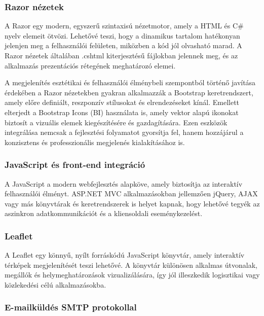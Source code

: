 \subsubsection{Razor nézetek}

\indent A Razor egy modern, egyszerű szintaxisú nézetmotor, amely a HTML és C\# nyelv elemeit ötvözi. Lehetővé teszi, hogy a dinamikus tartalom hatékonyan jelenjen meg a felhasználói felületen, miközben a kód jól olvasható marad. A Razor nézetek általában {.cshtml} kiterjesztésű fájlokban jelennek meg, és az alkalmazás prezentációs rétegének meghatározó elemei.

\indent A megjelenítés esztétikai és felhasználói élménybeli szempontból történő javítása érdekében a Razor nézetekben gyakran alkalmazzák a Bootstrap keretrendszert, amely előre definiált, reszponzív stílusokat és elrendezéseket kínál. Emellett elterjedt a Bootstrap Icons (BI) használata is, amely vektor alapú ikonokat biztosít a vizuális elemek kiegészítésére és gazdagítására. Ezen eszközök integrálása nemcsak a fejlesztési folyamatot gyorsítja fel, hanem hozzájárul a konzisztens és professzionális megjelenés kialakításához is.



\subsubsection{JavaScript és front-end integráció}

\indent A JavaScript a modern webfejlesztés alapköve, amely biztosítja az interaktív felhasználói élményt. ASP.NET MVC alkalmazásokban jellemzően jQuery, AJAX vagy más könyvtárak és keretrendszerek is helyet kapnak, hogy lehetővé tegyék az aszinkron adatkommunikációt és a kliensoldali eseménykezelést.

\subsubsection{Leaflet}

\indent A Leaflet egy könnyű, nyílt forráskódú JavaScript könyvtár, amely interaktív térképek megjelenítését teszi lehetővé. A könyvtár különösen alkalmas útvonalak, megállók és helymeghatározások vizualizálására, így jól illeszkedik logisztikai vagy közlekedési célú alkalmazásokba.

\subsubsection{E-mailküldés SMTP protokollal}

